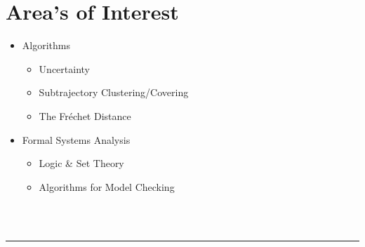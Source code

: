 \documentclass[11pt]{article}
\begin{document}
	\section*{Area's of Interest}
	\begin{itemize}[noitemsep, nolistsep]
		\item Algorithms
		\begin{itemize}
		\item Uncertainty
		\item Subtrajectory Clustering/Covering
		\item The Fréchet Distance
		\end{itemize}
		\item Formal Systems Analysis
		\begin{itemize}
			\item Logic \& Set Theory
			\item Algorithms for Model Checking
		\end{itemize}
	\end{itemize}
	\ \\\ \\
	\noindent\rule{\textwidth}{0.4pt}
\end{document}
